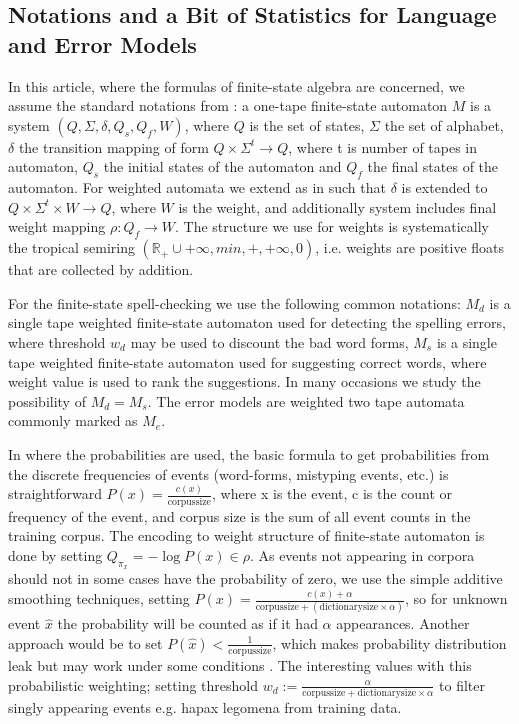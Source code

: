 \documentclass[a4paper,12pt]{article}
\begin{document}
\subsection{Notations and a Bit of Statistics for Language and Error Models}
\label{subsec:theory}

In this article, where the formulas of finite-state algebra are concerned, we
assume the standard notations from \cite{aho2007compilers}: a one-tape
finite-state automaton $M$ is a system $(Q, \Sigma, \delta, Q_s, Q_f, W)$,
where $Q$ is the set of states, $\Sigma$ the set of alphabet, $\delta$ the
transition mapping of form $Q \times \Sigma^t \rightarrow Q$, where t is number
of tapes in automaton, $Q_s$ the initial states of the automaton and $Q_f$ the
final states of the automaton. For weighted automata we extend as in
\cite{mohri2009weighted} such that $\delta$ is extended to $Q \times \Sigma^t
\times W \rightarrow Q$, where $W$ is the weight, and additionally system
includes final weight mapping $\rho: Q_f \rightarrow W$. The structure we
use for weights is systematically the tropical semiring 
$(\mathbb{R}_+ \cup {+\infty}, min, +, +\infty, 0)$, i.e. weights are positive
floats that are collected by addition.

For the finite-state spell-checking we use the following common notations:
$M_d$ is a single tape weighted finite-state automaton used for detecting the
spelling errors, where threshold $w_d$ may be used to discount the bad word
forms, $M_s$ is a single tape weighted finite-state automaton used for
suggesting correct words, where weight value is used to rank the suggestions.
In many occasions we study the possibility of $M_d = M_s$. The error models are
weighted two tape automata commonly marked as $M_e$.

In where the probabilities are used, the basic formula to get probabilities
from the discrete frequencies of events (word-forms, mistyping events, etc.) is
straightforward $P(x) = \frac{c(x)}{\mathrm{corpus size}}$, where x is the
event, c is the count or frequency of the event, and corpus size is the sum of
all event counts in the training corpus. The encoding to weight structure of
finite-state automaton is done by setting $Q_{\pi_x} = -\log P(x) \in \rho$.
As events not appearing in corpora should not in some cases have the
probability of zero, we use the simple additive smoothing techniques, setting
$P(x) = \frac{c(x) + \alpha}{\mathrm{corpus size} + (\mathrm{dictionary size}
\times \alpha)}$, so for unknown event $\hat{x}$ the probability will be
counted as if it had $\alpha$ appearances.  Another approach would be to set
$P(\hat{x}) < \frac{1}{\mathrm{corpus size}}$, which makes probability
distribution leak but may work under some conditions \cite[]{brants2007large}.
The interesting values with this probabilistic weighting; setting threshold
$w_d := \frac{\alpha}{\mathrm{corpus size} + \mathrm{dictionary size} \times
\alpha}$ to filter singly appearing events e.g. hapax legomena from training
data.
\end{document}
